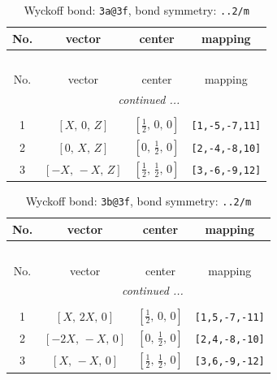 \documentclass[fleqn,8pt]{jsarticle}
\begin{document}
\begin{longtable}{cccc}
\caption{Wyckoff bond: {\tt 3a@3f}, bond symmetry: {\tt ..2/m}}
 \\
 \hline \hline
No. & vector & center & mapping \\ \hline \endfirsthead

\multicolumn{3}{l}{\tablename\ \thetable{}} \\
 \hline \hline
No. & vector & center & mapping \\ \hline \endhead

 \hline \hline
\multicolumn{3}{r}{\footnotesize\it continued ...} \\ \endfoot

 \hline \hline
\multicolumn{3}{r}{} \\ \endlastfoot

1 & $\left[ X,\, 0,\, Z \right]$ & $\left[ \frac{1}{2},\, 0,\, 0 \right]$ & {\tt [1,-5,-7,11]} \\ \hline
2 & $\left[ 0,\, X,\, Z \right]$ & $\left[ 0,\, \frac{1}{2},\, 0 \right]$ & {\tt [2,-4,-8,10]} \\ \hline
3 & $\left[ - X,\, - X,\, Z \right]$ & $\left[ \frac{1}{2},\, \frac{1}{2},\, 0 \right]$ & {\tt [3,-6,-9,12]} \\
\end{longtable}
\renewcommand{\arraystretch}{1.2}
\begin{longtable}{cccc}
\caption{Wyckoff bond: {\tt 3b@3f}, bond symmetry: {\tt ..2/m}}
 \\
 \hline \hline
No. & vector & center & mapping \\ \hline \endfirsthead

\multicolumn{3}{l}{\tablename\ \thetable{}} \\
 \hline \hline
No. & vector & center & mapping \\ \hline \endhead

 \hline \hline
\multicolumn{3}{r}{\footnotesize\it continued ...} \\ \endfoot

 \hline \hline
\multicolumn{3}{r}{} \\ \endlastfoot

1 & $\left[ X,\, 2 X,\, 0 \right]$ & $\left[ \frac{1}{2},\, 0,\, 0 \right]$ & {\tt [1,5,-7,-11]} \\ \hline
2 & $\left[ - 2 X,\, - X,\, 0 \right]$ & $\left[ 0,\, \frac{1}{2},\, 0 \right]$ & {\tt [2,4,-8,-10]} \\ \hline
3 & $\left[ X,\, - X,\, 0 \right]$ & $\left[ \frac{1}{2},\, \frac{1}{2},\, 0 \right]$ & {\tt [3,6,-9,-12]} \\
\end{longtable}
\end{document}
